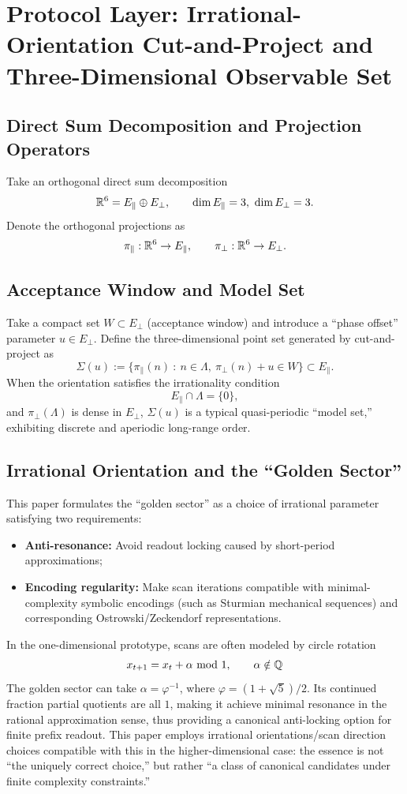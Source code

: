 \section{Protocol Layer: Irrational-Orientation Cut-and-Project and Three-Dimensional Observable Set}

\subsection{Direct Sum Decomposition and Projection Operators}

Take an orthogonal direct sum decomposition
\[
\mathbb{R}^{6}=E_{\parallel}\oplus E_{\perp},\qquad \dim E_{\parallel}=3,\ \dim E_{\perp}=3.
\]
Denote the orthogonal projections as
\[
\pi_{\parallel}:\mathbb{R}^{6}\to E_{\parallel},\qquad \pi_{\perp}:\mathbb{R}^{6}\to E_{\perp}.
\]

\subsection{Acceptance Window and Model Set}

Take a compact set $W\subset E_{\perp}$ (acceptance window) and introduce a ``phase offset'' parameter $u\in E_{\perp}$. Define the three-dimensional point set generated by cut-and-project as
\[
\Sigma(u):=\Big\{\pi_{\parallel}(n)\ :\ n\in\Lambda,\ \pi_{\perp}(n)+u\in W\Big\}\subset E_{\parallel}.
\]
When the orientation satisfies the irrationality condition
\[
E_{\parallel}\cap \Lambda = \{0\},
\]
and $\pi_{\perp}(\Lambda)$ is dense in $E_{\perp}$, $\Sigma(u)$ is a typical quasi-periodic ``model set,'' exhibiting discrete and aperiodic long-range order.

\subsection{Irrational Orientation and the ``Golden Sector''}

This paper formulates the ``golden sector'' as a choice of irrational parameter satisfying two requirements:
\begin{itemize}
  \item \textbf{Anti-resonance:} Avoid readout locking caused by short-period approximations;
  \item \textbf{Encoding regularity:} Make scan iterations compatible with minimal-complexity symbolic encodings (such as Sturmian mechanical sequences) and corresponding Ostrowski/Zeckendorf representations.
\end{itemize}

In the one-dimensional prototype, scans are often modeled by circle rotation
\[
x_{t+1}=x_t+\alpha\ \mathrm{mod}\ 1,\qquad \alpha\notin \QQ
\]
The golden sector can take $\alpha=\varphi^{-1}$, where $\varphi=(1+\sqrt{5})/2$. Its continued fraction partial quotients are all $1$, making it achieve minimal resonance in the rational approximation sense, thus providing a canonical anti-locking option for finite prefix readout. This paper employs irrational orientations/scan direction choices compatible with this in the higher-dimensional case: the essence is not ``the uniquely correct choice,'' but rather ``a class of canonical candidates under finite complexity constraints.''
